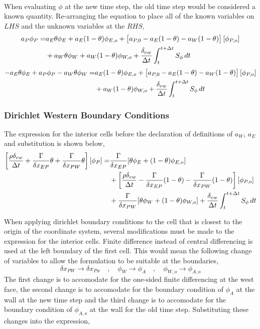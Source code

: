 \documentclass[class=report, 12pt, crop=false]{standalone}
\begin{document}
\begin{center}
\begin{equation*}
\begin{split}
\end{split}
\end{equation*}
When evaluating $\phi$ at the new time step, the old time step would be considered a known quantity. Re-arranging the equation to place all of the known variables on $LHS$ and the unknown variables at the $RHS$,
\begin{equation*}
\begin{split}
a_P\phi_{P} = & a_E\theta\phi_{E} + a_E(1-\theta)\phi_{E,o} + \left[a_{P,0} - a_E(1-\theta) - a_W(1-\theta)\right][\phi_{P,o}] \\ & + a_W\theta\phi_{W} + a_W(1-\theta)\phi_{W,o} + \frac{\delta_{ew}}{\Delta t}\int^{t+\Delta t}_{t} S_\phi\,dt 
\end{split}
\end{equation*}
\begin{equation*}
\begin{split}
 - a_E\theta\phi_{E} + a_P\phi_{P}  - a_W\theta\phi_{W} = & a_E(1-\theta)\phi_{E,o} + \left[a_{P,0} - a_E(1-\theta) - a_W(1-\theta)\right][\phi_{P,o}] \\ & + a_W(1-\theta)\phi_{W,o} + \frac{\delta_{ew}}{\Delta t}\int^{t+\Delta t}_{t} S_\phi\,dt 
\end{split}
\end{equation*}

\subsubsection{Dirichlet Western Boundary Conditions}
The expression for the interior cells before the declaration of definitions of $a_W$, $a_E$ and substitution is shown below,
\begin{equation*}
\begin{split}
\left[\frac{\rho\delta_{ew}}{\Delta t} + \frac{\Gamma}{\delta x_{EP}}\theta + \frac{\Gamma}{\delta x_{PW}}\theta\right][\phi_{P}] = & \frac{\Gamma }{\delta x_{EP}}[\theta\phi_{E} + (1-\theta)\phi_{E,o}]\\ & +\left[\frac{\rho\delta_{ew}}{\Delta t} - \frac{\Gamma }{\delta x_{EP}}(1-\theta) - \frac{\Gamma }{\delta x_{PW}}(1-\theta)\right][\phi_{P,o}] \\ &  + \frac{\Gamma }{\delta x_{PW}}[\theta\phi_{W} + (1-\theta)\phi_{W,o}] + \frac{\delta_{ew}}{\Delta t}\int^{t+\Delta t}_{t} S_\phi\,dt 
\end{split}
\end{equation*}

When applying dirichlet boundary conditions to the cell that is closest to the origin of the coordinate system, several modifications must be made to the expression for the interior cells. Finite difference instead of central differencing is used at the left boundary of the first cell. This would mean the following change of variables to allow the formulation to be suitable at the boundaries,
$$\delta x_{PW}\to \delta x_{Pw} \quad,\quad \phi_{W} \to \phi_{A} \quad,\quad \phi_{W,o} \to \phi_{A,o}$$
The first change is to accomodate for the one-sided finite differencing at the west face, the second change is to accomodate for the boundary condition of $\phi_{A}$ at the wall at the new time step and the third change is to accomodate for the boundary condition of $\phi_{A,o}$ at the wall for the old time step. Substituting these changes into the expression,


\end{center}
\end{document}
